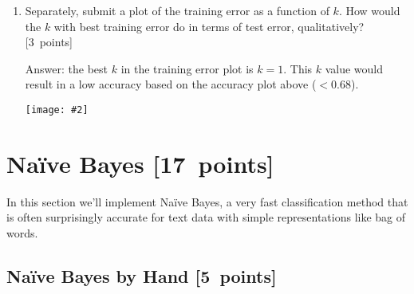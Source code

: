 \documentclass{article}
\newcommand{\blu}[1]{{\textcolor{blu}{#1}}}
\newcommand{\gre}[1]{\textcolor{gre}{#1}}
\newcommand\ans[1]{\par\gre{Answer: #1}}
\let\ask\blu
\newcommand\pts[1]{\textcolor{pointscolour}{[#1~points]}}
\newcommand{\centerfig}[2]{\begin{center}\texttt{[image: \#2]}\end{center}}
\begin{document}
\begin{enumerate}
        \item Separately, \ask{submit a plot of the training error as a function of $k$. How would the $k$ with best training error do in terms of test error, qualitatively?} \pts{3}

        \ans{ the best $k$ in the training error plot is $k = 1$. This $k$ value would result in a low accuracy based on the accuracy plot above ($< 0.68$).
        \centerfig{.7}{figs/q2_training error for ks.pdf}
        }
    \end{enumerate}



    \clearpage
    \section{Na\"ive Bayes \pts{17}}

    In this section we'll implement Na\"ive Bayes, a very fast classification method that is often surprisingly accurate for text data with simple representations like bag of words.


    \subsection{Na\"ive Bayes by Hand \pts{5}}
\end{document}
